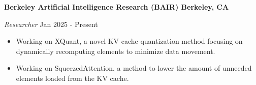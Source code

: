 \textbf{Berkeley Artificial Intelligence Research (BAIR) \hfill Berkeley, CA}\par
\textit{Researcher} \hfill Jan 2025 - Present
\begin{itemize}
\item Working on XQuant, a novel KV cache quantization method focusing on dynamically recomputing elements to minimize data movement.
\item Working on SqueezedAttention, a method to lower the amount of unneeded elements loaded from the KV cache.
\end{itemize}\par